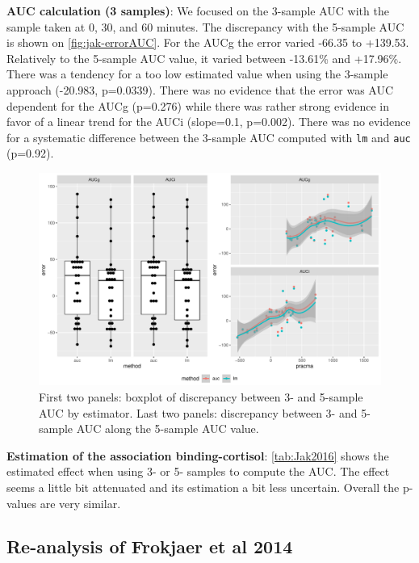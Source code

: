 \documentclass[12pt]{article}
\begin{document}
\textbf{AUC calculation (3 samples)}: We focused on the 3-sample AUC with the
sample taken at 0, 30, and 60 minutes. The discrepancy with the
5-sample AUC is shown on \autoref{fig:jak-errorAUC}. For the AUCg the
error varied -66.35 to +139.53. Relatively to the 5-sample AUC value,
it varied between -13.61\% and +17.96\%. There was a tendency for a too
low estimated value when using the 3-sample approach (-20.983,
p=0.0339). There was no evidence that the error was AUC dependent for
the AUCg (p=0.276) while there was rather strong evidence in favor of
a linear trend for the AUCi (slope=0.1, p=0.002). There was no
evidence for a systematic difference between the 3-sample AUC computed
with \texttt{lm} and \texttt{auc} (p=0.92).

\begin{figure}[!h]
\centering
\includegraphics[width=1\textwidth]{./figures/gg-jak-errorAUC.pdf}
\caption{\label{fig:jak-errorAUC}First two panels: boxplot of discrepancy between 3- and 5-sample AUC by estimator. Last two panels: discrepancy between 3- and 5-sample AUC along the 5-sample AUC value.}
\end{figure}

\bigskip

\textbf{Estimation of the association binding-cortisol}: \autoref{tab:Jak2016} shows
the estimated effect when using 3- or 5- samples to compute the
AUC. The effect seems a little bit attenuated and its estimation a bit
less uncertain. Overall the p-values are very similar.

\subsection{Re-analysis of Frokjaer et al 2014}
\label{sec:org7227952}
\end{document}
